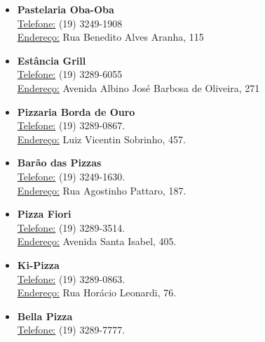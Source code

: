 \begin{itemize}
\item  \textbf{Pastelaria Oba-Oba}
\\\underline{Telefone:} (19) 3249-1908
\\\underline{Endereço:} Rua Benedito Alves Aranha, 115
\end{itemize}

\begin{itemize}
\item  \textbf{Estância Grill}
\\\underline{Telefone:} (19) 3289-6055
\\\underline{Endereço:} Avenida Albino José Barbosa de Oliveira, 271
\end{itemize}

\begin{itemize}
\item  \textbf{Pizzaria Borda de Ouro}
\\\underline{Telefone:} (19) 3289-0867.
\\\underline{Endereço:} Luiz Vicentin Sobrinho, 457.
\end{itemize}

\begin{itemize}
\item  \textbf{Barão das Pizzas}
\\\underline{Telefone:} (19) 3249-1630.
\\\underline{Endereço:} Rua Agostinho Pattaro, 187.
\end{itemize}

\begin{itemize}
\item  \textbf{Pizza Fiori}
\\\underline{Telefone:} (19) 3289-3514.
\\\underline{Endereço:} Avenida Santa Isabel, 405.
\end{itemize}

\begin{itemize}
\item  \textbf{Ki-Pizza}
\\\underline{Telefone:} (19) 3289-0863.
\\\underline{Endereço:} Rua Horácio Leonardi, 76.
\end{itemize}

\begin{itemize}
\item  \textbf{Bella Pizza}
\\\underline{Telefone:} (19) 3289-7777.
\end{itemize}

